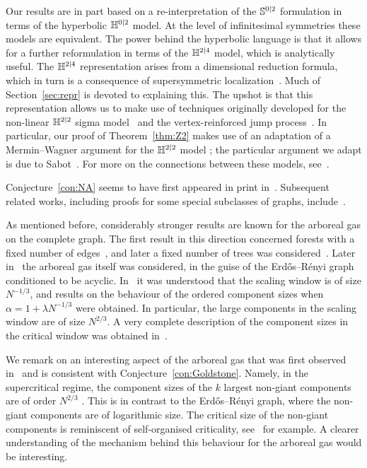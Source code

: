 \documentclass[11pt]{amsart}
\numberwithin{equation}{section}
\numberwithin{theorem}{section}
\begin{document}
Our results are in part based on a re-interpretation of the
${\mathbb S}^{0|2}$ formulation in terms of the hyperbolic $\mathbb{H}^{0|2}$
model. At the level of infinitesimal symmetries these models are
equivalent. The power behind the hyperbolic language is that it allows
for a further reformulation in terms of the $\mathbb{H}^{2|4}$ model, which
is analytically useful. The $\mathbb{H}^{2|4}$ representation arises from a
dimensional reduction formula, which in turn is a consequence of
supersymmetric
localization~\cite{PhysRevLett.43.744,MR2031859,1812.04422}. Much of
Section~\ref{sec:repr} is devoted to explaining this. The upshot is
that this representation allows us to make use of techniques
originally developed for the non-linear $\mathbb{H}^{2|2}$ sigma
model~\cite{MR863830,MR1134935,MR1411617,MR2728731,MR2736958} and the
vertex-reinforced jump process~\cite{MR3420510,MR3189433}.  In
particular, our proof of Theorem~\ref{thm:Z2} makes use of an
adaptation of a Mermin--Wagner argument for the $\mathbb{H}^{2|2}$ model
\cite{1907.07949,1911.08579,MR4021254}; the particular argument
  we adapt is due to Sabot~\cite{1907.07949}.  For more on the connections between these
models, see~\cite{MR3420510,MR4021254}.

Conjecture~\ref{con:NA} seems to have first appeared in print
in~\cite{MR1774843}. Subsequent related works, including 
proofs for some special subclasses of graphs,
include~\cite{MR2060630,MR2410396,1902.03719,MR2836455}.

As mentioned before, considerably stronger results are known for the
arboreal gas on the complete graph. The first result in this direction
concerned forests with a fixed number of edges~\cite{MR1167294},
and later a fixed number of trees was considered~\cite{MR2567041}.
Later in~\cite{MR3845513} the arboreal
gas itself was considered, in the guise of the Erd\H{o}s--R\'{e}nyi
graph conditioned to be acyclic. In~\cite{MR1167294} it was understood
that the scaling window is of size $N^{-1/3}$, and results on the
behaviour of the ordered component sizes when
$\alpha = 1 +\lambda N^{-1/3}$ were obtained. In particular, the large
components in the scaling window are of size $N^{2/3}$. A very
complete description of the component sizes in the critical window was
obtained in~\cite{MR3845513}.

We remark on an interesting aspect of the arboreal gas that was first
observed in~\cite{MR1167294} and is consistent with
Conjecture~\ref{con:Goldstone}. Namely, in the supercritical regime,
the component sizes of the $k$ largest non-giant components are of
order $N^{2/3}$ \cite[Theorem~5.2]{MR1167294}. This is in contrast to
the Erd\H{o}s--R\'{e}nyi graph, where the non-giant components are of
logarithmic size. The critical size of the non-giant components is
reminiscent of self-organised criticality, see~\cite{MR2564286} for
example. A clearer understanding of the mechanism behind this
behaviour for the arboreal gas would be interesting.
\end{document}
